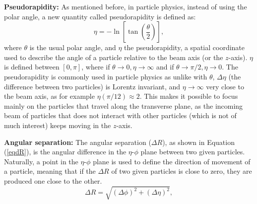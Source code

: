\textbf{Pseudorapidity:} As mentioned before, in particle physics, instead of using the polar angle, a new quantity called pseudorapidity is defined as:
\begin{equation}
\label{eqeta} 
    \eta = -\ln\left[{\tan\left({\dfrac{\theta}{2}}\right)}\right],
\end{equation}
where $\theta$ is the usual polar angle, and $\eta$ the pseudorapidity, a spatial coordinate used to describe the angle of a particle relative to the beam axis (or the $z$-axis). $\eta$ is defined between $[0,\pi]$, where if $\theta \rightarrow 0, \eta \rightarrow \infty$ and if $\theta \rightarrow \pi/2, \eta \rightarrow 0$. The pseudorapidity is commonly used in particle physics as unlike with $\theta$, $\Delta \eta$ (the difference between two particles) is Lorentz invariant, and $\eta \rightarrow \infty$ very close to the beam axis, as for example $\eta(\pi/12) \approx 2$. This makes it possible to focus mainly on the particles that travel along the transverse plane, as the incoming beam of particles that does not interact with other particles (which is not of much interest) keeps moving in the $z$-axis.

\textbf{Angular separation:} The angular separation ($\Delta R$), as shown in Equation (\ref{eqdR}), is the angular difference in the $\eta$-$\phi$ plane between two given particles. Naturally, a point in the $\eta$-$\phi$ plane is used to define the direction of movement of a particle, meaning that if the $\Delta R$ of two given particles is close to zero, they are produced one close to the other.
\begin{equation}
\label{eqdR}
    \Delta R = \sqrt{(\Delta \phi)^2 + (\Delta \eta)^2},
\end{equation}


